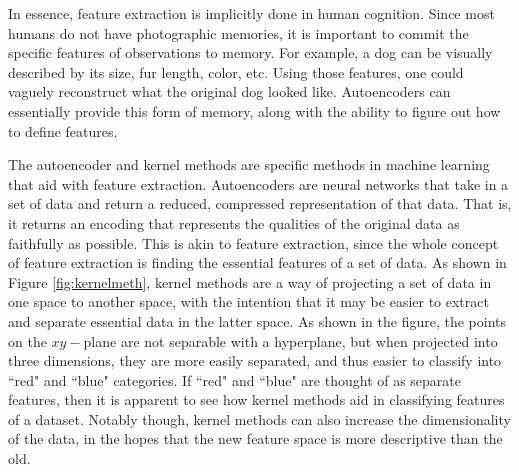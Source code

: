 \documentclass{sig-alternate}
\begin{document}
In essence, feature extraction is implicitly done in human cognition. Since most humans do not have
photographic memories, it is important to commit the specific features of observations to memory. 
For example, a dog can be visually described by its size, fur length, color, etc. Using those
features, one could vaguely reconstruct what the original dog looked like. Autoencoders can essentially
provide this form of memory, along with the ability to figure out how to define features.

The autoencoder and kernel methods are specific methods in machine learning that aid with feature
extraction. Autoencoders are neural networks that take in a set of data and return a reduced, 
compressed representation of that data. That is, it returns an encoding that represents the qualities of
the original data as faithfully as possible. This is akin to feature 
extraction, since the whole concept of feature extraction is finding the essential features 
of a set of data. As shown in Figure \ref{fig:kernelmeth}, kernel methods are a way of projecting
a set of data in one space to another space, with the intention that it may
be easier to extract and separate essential data in the latter space. As shown in the figure, the
points on the $xy-$plane are not separable with a hyperplane, but when projected into three 
dimensions, they are more easily separated, and thus easier to classify into ``red" and ``blue" 
categories. If ``red" and ``blue" are thought of as separate features, then it is apparent to see
how kernel methods aid in classifying features of a dataset. Notably though, kernel methods can
also increase the dimensionality of the data, in the hopes that the new feature space is more 
descriptive than the old. 
\end{document}
